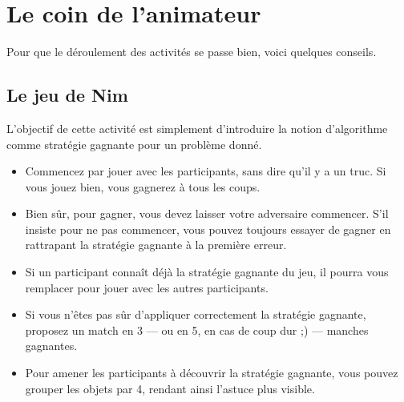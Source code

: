 \documentclass[a5paper,pagesize,DIV=14]{scrbook}
\begin{document}
\chapter*{Le coin de l'animateur}
\label{chap:coin-animateur}

Pour que le déroulement des activités se passe bien, voici quelques conseils.


\section*{Le jeu de Nim}

L'objectif de cette activité est simplement d'introduire la notion d'algorithme comme stratégie gagnante pour un problème donné.

\begin{itemize}
  \item Commencez par jouer avec les participants, sans dire qu'il y a un truc. Si vous jouez bien, vous gagnerez à tous les coups.
  \item Bien sûr, pour gagner, vous devez laisser votre adversaire commencer.
    S'il insiste pour ne pas commencer, vous pouvez toujours essayer de gagner
    en rattrapant la stratégie gagnante à la première erreur.
  \item Si un participant connaît déjà la stratégie gagnante du jeu, il pourra vous remplacer pour jouer avec les autres participants.
  \item Si vous n'êtes pas sûr d'appliquer correctement la stratégie gagnante,
    proposez un match en 3 --- ou en 5, en cas de coup dur ;) --- manches
    gagnantes.
  \item Pour amener les participants à découvrir la stratégie gagnante, vous pouvez grouper les objets par 4, rendant ainsi l'astuce plus visible.
\end{itemize}
\end{document}
